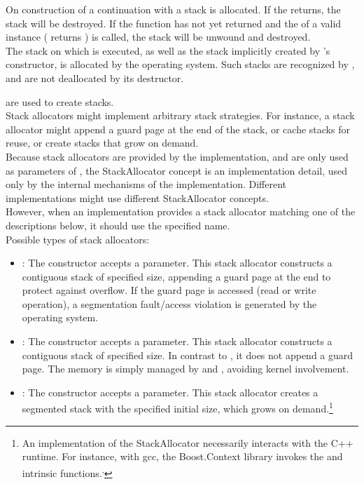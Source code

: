 \label{subsec:destruction}
On construction of a continuation with \callcc a stack is allocated. If the
\entryfn returns, the stack will be destroyed. If the function has not
yet returned and the  of a valid \cont instance (\opbool
returns ) is called, the stack will be unwound and destroyed.\\
The stack on which  is executed, as well as the stack implicitly
created by 's constructor, is allocated by the operating
system. Such stacks are recognized by \cont, and are not deallocated by its
destructor.


\label{subsec:stackalloc}
are used to create stacks.\\
Stack allocators might implement arbitrary stack strategies. For instance, a
stack allocator might append a guard page at the end of the stack, or cache
stacks for reuse, or create stacks that grow on demand.\\
Because stack allocators are provided by the implementation, and are only used
as parameters of \callcc, the StackAllocator concept is an implementation detail,
used only by the internal mechanisms of the \cc implementation. Different
implementations might use different StackAllocator concepts.\\
However, when an implementation provides a stack allocator matching one of
the descriptions below, it should use the specified name.\\
Possible types of stack allocators:
\begin{itemize}
    \item {}: The constructor accepts a 
        parameter. This stack allocator constructs a contiguous stack of
        specified size, appending a guard page at the end to protect against
        overflow. If the guard page is accessed (read or write operation), a
        segmentation fault/access violation is generated by the operating
        system.
    \item {}: The constructor accepts a  parameter.
        This stack allocator constructs a contiguous stack of specified size.
        In contrast to , it does not append a guard
        page. The memory is simply managed by 
        and , avoiding kernel involvement.
    \item {}: The constructor accepts a  parameter.
        This stack allocator creates a segmented stack with the specified
        initial size, which grows on demand.\footnote{An implementation of
        the  StackAllocator necessarily interacts with the C++
        runtime. For instance, with gcc, the Boost.Context\cite{bcontext} library
        invokes the 
        and  intrinsic
        functions.\cite{splitalloc}\textsuperscript{,}\cite{bctxseg}}
\end{itemize}

